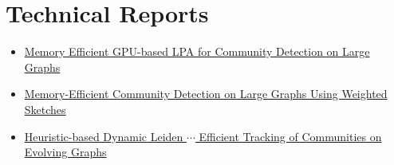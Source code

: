 \section*{Technical Reports}

\begin{itemize}[noitemsep, leftmargin=*]
  \item \href{https://arxiv.org/abs/2411.19901}{Memory Efficient GPU-based LPA for Community Detection on Large Graphs}
  \item \href{https://arxiv.org/abs/2411.02268}{Memory-Efficient Community Detection on Large Graphs Using Weighted Sketches}
  \item \href{https://arxiv.org/abs/2410.15451}{Heuristic-based Dynamic Leiden $\cdots$ Efficient Tracking of Communities on Evolving Graphs}
\end{itemize}
